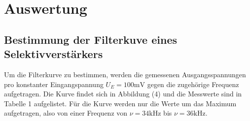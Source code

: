 \section{Auswertung}
\label{sec:Auswertung}
\subsection{Bestimmung der Filterkuve eines Selektivverstärkers}
Um die Filterkurve zu bestimmen, werden die gemessenen Ausgangsspannungen pro konstanter Eingangspannung $U_E = 100\si{\milli\volt}$ gegen die zugehörige Frequenz aufgetragen.
Die Kurve findet sich in Abbildung (4) und die Messwerte sind in Tabelle 1 aufgelistet. Für die Kurve werden nur die Werte um das Maximum aufgetragen, also von einer Frequenz von $\nu = 34 \si{\kilo\hertz}$ bis $\nu = 36 \si{\kilo\hertz}$.


